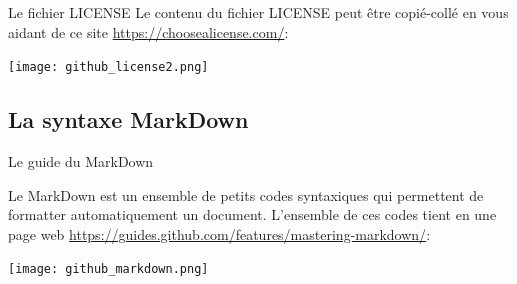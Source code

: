 \documentclass{beamer}
\begin{document}
\begin{frame}{Le fichier LICENSE}
Le contenu du fichier LICENSE peut être copié-collé en vous aidant de ce site \url{https://choosealicense.com/}:
\begin{center}
	\texttt{[image: github\_license2.png]}
\end{center}
\end{frame}


\subsection{La syntaxe MarkDown}
\begin{frame}{Le guide du MarkDown}

Le MarkDown est un ensemble de petits codes syntaxiques qui permettent de formatter automatiquement un document. L'ensemble de ces codes tient en une page web \url{https://guides.github.com/features/mastering-markdown/}: 
\begin{center}
	\texttt{[image: github\_markdown.png]}
\end{center}
\end{frame}
\end{document}
